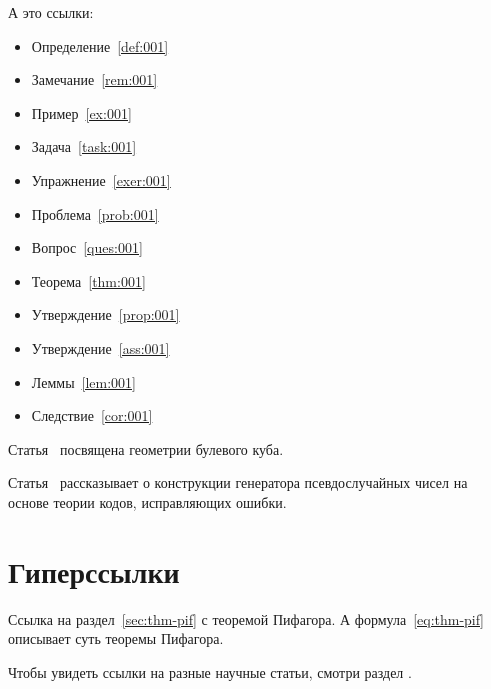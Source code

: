 \documentclass[colorthm, bib]{../civarticle}
\begin{document}
\begin{assertion*}
  \Blindtext[2]
\end{assertion*}

\begin{corollary}
  \label{cor:001}
  \Blindtext[2]
\end{corollary}

\begin{corollary*}
  \Blindtext[2]
\end{corollary*}

\begin{lemma}
  \label{lem:001}
  \Blindtext[2]
\end{lemma}

\begin{lemma*}
  \Blindtext[2]
\end{lemma*}

А это ссылки:

\begin{itemize}
\item Определение~\ref{def:001}
\item Замечание~\ref{rem:001}
\item Пример~\ref{ex:001}
\item Задача~\ref{task:001}
\item Упражнение~\ref{exer:001}
\item Проблема~\ref{prob:001}
\item Вопрос~\ref{ques:001}
\item Теорема~\ref{thm:001}
\item Утверждение~\ref{prop:001}
\item Утверждение~\ref{ass:001}
\item Леммы~\ref{lem:001}
\item Следствие~\ref{cor:001}
\end{itemize}

Статья~\cite{ahlswede1977} посвящена геометрии булевого куба.

Статья~\cite{ahmed2013} рассказывает о конструкции генератора
псевдослучайных чисел на основе теории кодов, исправляющих ошибки.


\section{Гиперссылки}
\label{sec:hyper}

Ссылка на раздел~\ref{sec:thm-pif} с теоремой Пифагора.  А
формула~\eqref{eq:thm-pif} описывает суть теоремы Пифагора.

Чтобы увидеть ссылки на разные научные статьи, смотри раздел
\hyperref[sec:ref-to-articles]{}.
\end{document}
